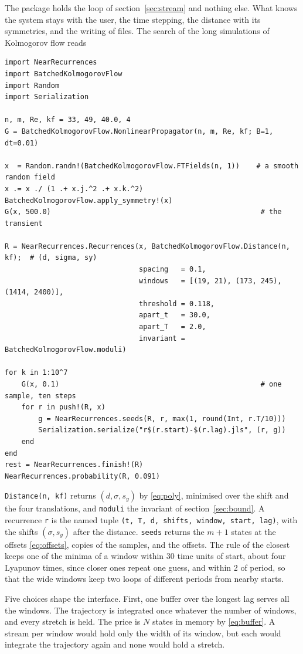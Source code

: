 \documentclass[11pt]{article}
\newcommand{\code}[1]{\texttt{#1}}
\begin{document}
The package holds the loop of section~\ref{sec:stream} and nothing else. What knows the system stays with the user, the time stepping, the distance with its symmetries, and the writing of files. The search of the long simulations of Kolmogorov flow reads
\begin{Verbatim}
import NearRecurrences
import BatchedKolmogorovFlow
import Random
import Serialization

n, m, Re, kf = 33, 49, 40.0, 4
G = BatchedKolmogorovFlow.NonlinearPropagator(n, m, Re, kf; B=1, dt=0.01)

x  = Random.randn!(BatchedKolmogorovFlow.FTFields(n, 1))    # a smooth random field
x .= x ./ (1 .+ x.j.^2 .+ x.k.^2)
BatchedKolmogorovFlow.apply_symmetry!(x)
G(x, 500.0)                                                  # the transient

R = NearRecurrences.Recurrences(x, BatchedKolmogorovFlow.Distance(n, kf);  # (d, sigma, sy)
                                spacing   = 0.1,
                                windows   = [(19, 21), (173, 245), (1414, 2400)],
                                threshold = 0.118,
                                apart_t   = 30.0,
                                apart_T   = 2.0,
                                invariant = BatchedKolmogorovFlow.moduli)

for k in 1:10^7
    G(x, 0.1)                                                # one sample, ten steps
    for r in push!(R, x)
        g = NearRecurrences.seeds(R, r, max(1, round(Int, r.T/10)))
        Serialization.serialize("r$(r.start)-$(r.lag).jls", (r, g))
    end
end
rest = NearRecurrences.finish!(R)
NearRecurrences.probability(R, 0.091)
\end{Verbatim}
\code{Distance(n, kf)} returns $(d, \sigma, s_y)$ by \eqref{eq:poly}, minimised over the shift and the four translations, and \code{moduli} the invariant of section~\ref{sec:bound}. A recurrence \code{r} is the named tuple \code{(t, T, d, shifts, window, start, lag)}, with the shifts $(\sigma, s_y)$ after the distance. \code{seeds} returns the $m + 1$ states at the offsets \eqref{eq:offsets}, copies of the samples, and the offsets. The rule of the closest keeps one of the minima of a window within 30 time units of start, about four Lyapunov times, since closer ones repeat one guess, and within 2 of period, so that the wide windows keep two loops of different periods from nearby starts.

Five choices shape the interface. First, one buffer over the longest lag serves all the windows. The trajectory is integrated once whatever the number of windows, and every stretch is held. The price is $N$ states in memory by \eqref{eq:buffer}. A stream per window would hold only the width of its window, but each would integrate the trajectory again and none would hold a stretch.
\end{document}
